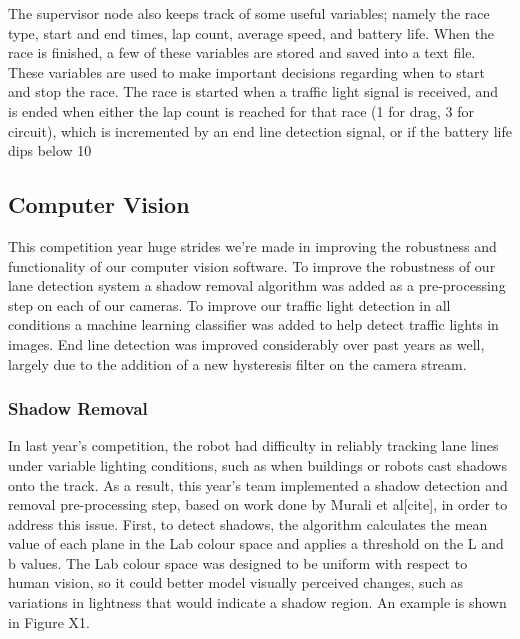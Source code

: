 \documentclass[11pt,journal]{IEEEtran}
\begin{document}
The supervisor node also keeps track of some useful variables; namely the race type, start and end times, lap count, average speed, and battery life. When the race is finished, a few of these variables are stored and saved into a text file. These variables are used to make important decisions regarding when to start and stop the race. The race is started when a traffic light signal is received, and is ended when either the lap count is reached for that race (1 for drag, 3 for circuit), which is incremented by an end line detection signal, or if the battery life dips below 10%

\subsection{Computer Vision}
This competition year huge strides we're made in improving the robustness and functionality of our computer vision software. To improve the robustness of our lane detection system a shadow removal algorithm was added as a pre-processing step on each of our cameras. To improve our traffic light detection in all conditions a machine learning classifier was added to help detect traffic lights in images. End line detection was improved considerably over past years as well, largely due to the addition of a new hysteresis filter on the camera stream. 

\subsubsection{Shadow Removal}
In last year's competition, the robot had difficulty in reliably tracking lane lines under variable lighting conditions, such as when buildings or robots cast shadows onto the track. As a result, this year's team implemented a shadow detection and removal pre-processing step, based on work done by Murali et al[cite], in order to address this issue.
First, to detect shadows, the algorithm calculates the mean value of each plane in the Lab colour space and applies a threshold on the L and b values. The Lab colour space was designed to be uniform with respect to human vision, so it could better model visually perceived changes, such as variations in lightness that would indicate a shadow region. An example is shown in Figure X1.
\end{document}
